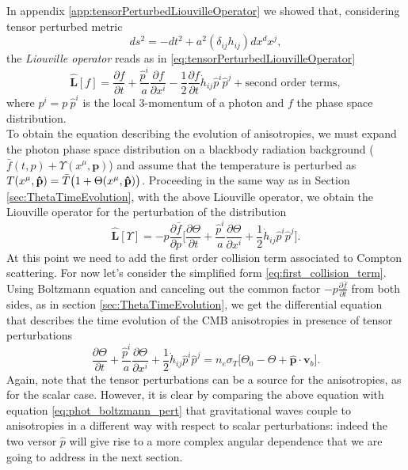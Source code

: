 In appendix \ref{app:tensorPerturbedLiouvilleOperator} we showed that, considering tensor perturbed metric $$ds^2=-dt^2+a^2(\delta_{ij}h_{ij})dx^dx^j,$$the \emph{Liouville operator} reads as in \eqref{eq:tensorPerturbedLiouvilleOperator}
$$\hat{\mathbf{L}}[f]=\frac{\partial f}{\partial t}+\frac{\hat p^i}{a}\frac{\partial f}{\partial x^i}-\frac{1}{2}\frac{\partial f}{\partial t}\dot{h}_{ij}\hat p^i\hat p^j+\text{second order terms},$$
where $p^i=p\ \hat p^i$ is the local 3-momentum of a photon and $f$ the phase space distribution.\\
To obtain the equation describing the evolution of anisotropies, we must expand the photon phase space distribution on a blackbody radiation background ($\bar{f}(t,p)+\Upsilon(x^\mu,\mathbf p) $) and assume that the temperature is perturbed as $T(x^\mu,\mathbf{\hat{p}})=\bar T \big(1+\Theta(x^\mu,\mathbf{\hat{p}})\big)$. Proceeding in the same way as in Section \ref{sec:ThetaTimeEvolution}, with the above Liouville operator, we obtain the Liouville operator for the perturbation of the distribution
$$\hat{\mathbf{L}}[\Upsilon]=-p\frac{\partial \bar f}{\partial p}\bigg[\frac{\partial \Theta}{\partial t}+\frac{\hat p^i}{a}\frac{\partial \Theta}{\partial x^i}+\frac{1}{2}\dot{h}_{ij}\hat p^i\hat p^j\bigg].$$
At this point we need to add the first order collision term associated to Compton scattering. For now let's consider the simplified form \eqref{eq:first_collision_term}. Using Boltzmann equation and canceling out the common factor $-p\frac{\partial\bar f}{\partial t}$ from both sides, as in section \ref{sec:ThetaTimeEvolution}, we get the differential equation that describes the time evolution of the CMB anisotropies in presence of tensor perturbations
\begin{equation}
    \label{eq:tensor_anisotropies_boltzmann}
    \frac{\partial \Theta}{\partial t}+\frac{\hat p^i}{a}\frac{\partial \Theta}{\partial x^i}+\frac{1}{2}\dot{h}_{ij}\hat p^i\hat p^j=n_{e}\sigma_T\bigg[\Theta_0-\Theta+\mathbf{\hat{p}}\cdot\mathbf{v}_{b}\bigg].
\end{equation}
Again, note that the tensor perturbations can be a source for the anisotropies, as for the scalar case. However, it is clear by comparing the above equation with equation \eqref{eq:phot_boltzmann_pert} that gravitational waves couple to anisotropies in a different way with respect to scalar perturbations: indeed the two versor $\hat p$ will give rise to a more complex angular dependence that we are going to address in the next section.
